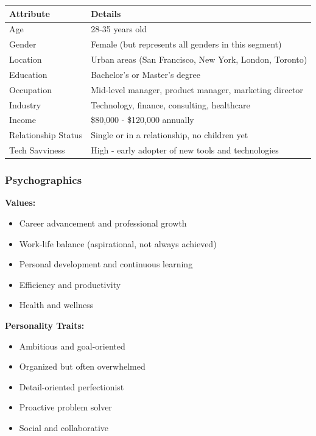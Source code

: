\begin{table}[H]
\centering
\begin{tabular}{|l|p{10cm}|}
\hline
\rowcolor{lightgray}
\textbf{Attribute} & \textbf{Details} \\
\hline
Age & 28-35 years old \\
\hline
Gender & Female (but represents all genders in this segment) \\
\hline
Location & Urban areas (San Francisco, New York, London, Toronto) \\
\hline
Education & Bachelor's or Master's degree \\
\hline
Occupation & Mid-level manager, product manager, marketing director \\
\hline
Industry & Technology, finance, consulting, healthcare \\
\hline
Income & \$80,000 - \$120,000 annually \\
\hline
Relationship Status & Single or in a relationship, no children yet \\
\hline
Tech Savviness & High - early adopter of new tools and technologies \\
\hline
\end{tabular}
\end{table}

\subsubsection{Psychographics}

\textbf{Values:}
\begin{itemize}
    \item Career advancement and professional growth
    \item Work-life balance (aspirational, not always achieved)
    \item Personal development and continuous learning
    \item Efficiency and productivity
    \item Health and wellness
\end{itemize}

\textbf{Personality Traits:}
\begin{itemize}
    \item Ambitious and goal-oriented
    \item Organized but often overwhelmed
    \item Detail-oriented perfectionist
    \item Proactive problem solver
    \item Social and collaborative
\end{itemize}

